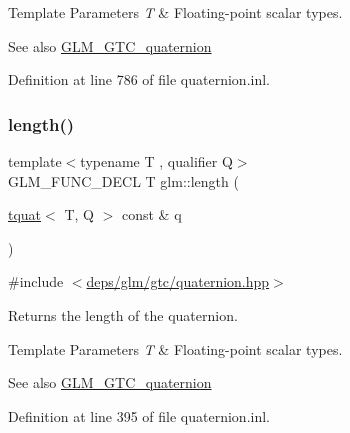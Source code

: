 \begin{DoxyTemplParams}{Template Parameters}
{\em T} & Floating-\/point scalar types.\\
\hline
\end{DoxyTemplParams}
\begin{DoxySeeAlso}{See also}
\hyperlink{group__gtc__quaternion}{G\+L\+M\+\_\+\+G\+T\+C\+\_\+quaternion} 
\end{DoxySeeAlso}


Definition at line 786 of file quaternion.\+inl.

\mbox{\label{group__gtc__quaternion_gab33f82f8d1c9223d335aab752a126855}} 
\subsubsection{\texorpdfstring{length()}{length()}}
{\footnotesize\ttfamily template$<$typename T , qualifier Q$>$ \\
G\+L\+M\+\_\+\+F\+U\+N\+C\+\_\+\+D\+E\+CL T glm\+::length (\begin{DoxyParamCaption}\item[{\hyperlink{structglm_1_1tquat}{tquat}$<$ T, Q $>$ const \&}]{q }\end{DoxyParamCaption})}



{\ttfamily \#include $<$\hyperlink{gtc_2quaternion_8hpp}{deps/glm/gtc/quaternion.\+hpp}$>$}

Returns the length of the quaternion.


\begin{DoxyTemplParams}{Template Parameters}
{\em T} & Floating-\/point scalar types.\\
\hline
\end{DoxyTemplParams}
\begin{DoxySeeAlso}{See also}
\hyperlink{group__gtc__quaternion}{G\+L\+M\+\_\+\+G\+T\+C\+\_\+quaternion} 
\end{DoxySeeAlso}


Definition at line 395 of file quaternion.\+inl.

\mbox{\label{group__gtc__quaternion_gabc58e7013ef63d6df69c28c14afd0c01}} 
